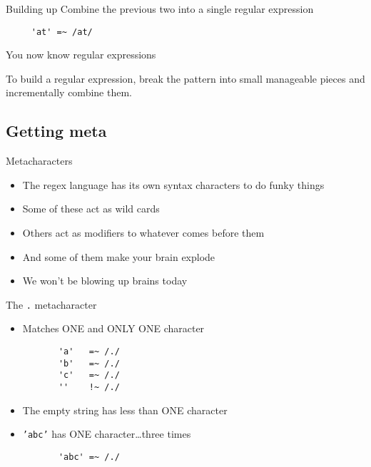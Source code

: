 \documentclass{beamer}
\begin{document}
\begin{frame}[fragile]{Building up}
  Combine the previous two into a single regular expression
  \begin{verbatim}
     'at' =~ /at/
  \end{verbatim}
\end{frame}

\begin{frame}{You now know regular expressions}
  \begin{center}
  To build a regular expression, break the pattern into small manageable pieces and incrementally combine them.
  \end{center}
\end{frame}

\subsection{Getting meta}

\begin{frame}{Metacharacters}
  \begin{itemize}
  \item<1->The regex language has its own syntax characters to do funky things
  \item<2->Some of these act as wild cards
  \item<2->Others act as modifiers to whatever comes before them
  \item<2->And some of them make your brain explode
  \item<3->We won't be blowing up brains today
  \end{itemize}
\end{frame}

\begin{frame}[fragile]{The \texttt{.} metacharacter}
  \begin{itemize}
  \item<1->Matches ONE and ONLY ONE character
    \begin{verbatim}
       'a'   =~ /./
       'b'   =~ /./
       'c'   =~ /./
       ''    !~ /./
    \end{verbatim}
  \item<2->The empty string has less than ONE character
  \item<3->\texttt{'abc'} has ONE character\ldots three times
    \begin{verbatim}
       'abc' =~ /./
    \end{verbatim}
  \end{itemize}
\end{frame}
\end{document}
